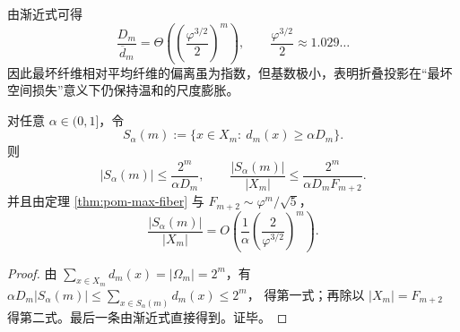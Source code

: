 \begin{remark}[最坏尺度与平均尺度的偏离]\label{rem:pom-defect-gap}
由渐近式可得
\[
\frac{D_m}{\overline d_m}
=
\Theta\!\left(\left(\frac{\varphi^{3/2}}{2}\right)^m\right),
\qquad
\frac{\varphi^{3/2}}{2}\approx 1.029\ldots
\]
因此最坏纤维相对平均纤维的偏离虽为指数，但基数极小，表明折叠投影在“最坏空间损失”意义下仍保持温和的尺度膨胀。
\end{remark}

\begin{corollary}[高多重纤维的稀疏性]\label{cor:pom-high-multiplicity-sparse}
对任意 $\alpha\in(0,1]$，令
\[
S_\alpha(m):=\{x\in X_m:\ d_m(x)\ge \alpha D_m\}.
\]
则
\[
|S_\alpha(m)|\le \frac{2^m}{\alpha D_m},
\qquad
\frac{|S_\alpha(m)|}{|X_m|}\le \frac{2^m}{\alpha D_m F_{m+2}}.
\]
并且由定理 \ref{thm:pom-max-fiber} 与 $F_{m+2}\sim \varphi^m/\sqrt5$，
\[
\frac{|S_\alpha(m)|}{|X_m|}
=O\!\left(\frac{1}{\alpha}\left(\frac{2}{\varphi^{3/2}}\right)^m\right).
\]
\end{corollary}
\begin{proof}
由 $\sum_{x\in X_m} d_m(x)=|\Omega_m|=2^m$，有
\(
\alpha D_m |S_\alpha(m)|\le \sum_{x\in S_\alpha(m)} d_m(x)\le 2^m
\)，
得第一式；再除以 $|X_m|=F_{m+2}$ 得第二式。最后一条由渐近式直接得到。证毕。
\end{proof}
